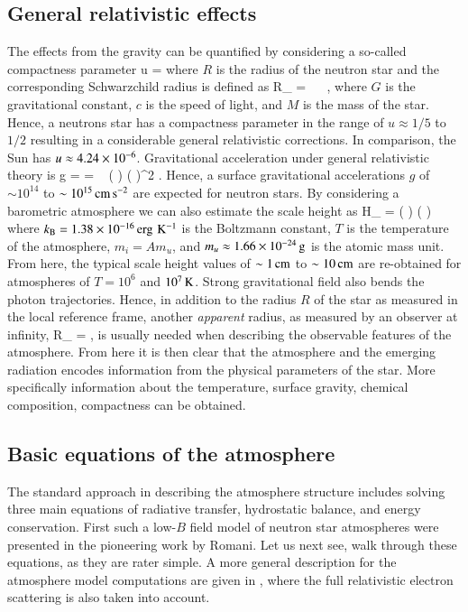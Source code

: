 \subsection{General relativistic effects}
The effects from the gravity can be quantified by considering a so-called compactness parameter
\be
u = 
\ee
where $R$ is the radius of the neutron star and the corresponding Schwarzchild radius is defined as
\be
R_{} =    \km,
\ee
where $G$ is the gravitational constant, $c$ is the speed of light, and $M$ is the mass of the star.
Hence, a neutrons star has a compactness parameter in the range of $u \approx 1/5$ to $1/2$ resulting in a considerable general relativistic corrections.
In comparison, the Sun has $u \approx 4.24 \times 10^{-6}$.
Gravitational acceleration under general relativistic theory is
\be
g =   =   \left(  \right) \left(  \right)^2 \cmss.
\ee
Hence, a surface gravitational accelerations $g$ of $\sim 10^{14}$ to $\sim 10^{15}\, \mathrm{cm}\,\mathrm{s}^{-2}$ are expected for neutron stars.
By considering a barometric atmosphere we can also estimate the scale height as
\be
H_{} =  \approx {} \left(  \right) \left(  \right) \cm
\ee
where $k_{\mathrm{B}} = 1.38 \times 10^{-16} \, \mathrm{erg} \, \, \mathrm{K}^{-1}$ is the Boltzmann constant, $T$ is the temperature of the atmosphere, $m_i = A m_u$, and $m_u \approx 1.66 \times 10^{-24}\, \mathrm{g}$ is the atomic mass unit.
From here, the typical scale height values of $\sim 1\, \mathrm{cm}$ to $\sim 10\, \mathrm{cm}$ are re-obtained for atmospheres of $T=10^6$ and $10^7\, \mathrm{K}$.\cite{ZP02, Potekhin14}
Strong gravitational field also bends the photon trajectories.\cite{PFC83}
Hence, in addition to the radius $R$ of the star as measured in the local reference frame, another \emph{apparent} radius, as measured by an observer at infinity, 
\be
R_{\infty} = ,
\ee
is usually needed when describing the observable features of the atmosphere.
From here it is then clear that the atmosphere and the emerging radiation encodes information from the physical parameters of the star.
More specifically information about the temperature, surface gravity, chemical composition, compactness can be obtained.

\subsection{Basic equations of the atmosphere}
The standard approach in describing the atmosphere structure includes solving three main equations of radiative transfer, hydrostatic balance, and energy conservation.
First such a low-$B$ field model of neutron star atmospheres were presented in the pioneering work by Romani.\cite{Romani87}
Let us next see, walk through these equations, as they are rater simple.
A more general description for the atmosphere model computations are given in \cite{NKS15}, where the full relativistic electron scattering is also taken into account.

